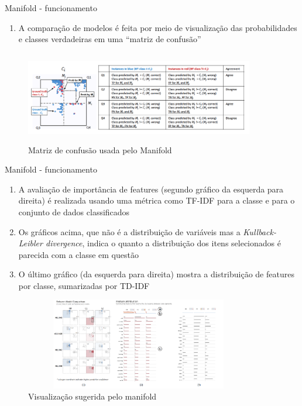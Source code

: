 \begin{frame}
	\begin{block}{Manifold - funcionamento}
		\begin{enumerate}
			\item A comparação de modelos é feita por meio de visualização das probabilidades e classes verdadeiras em uma ``matriz de confusão''
		\end{enumerate}
		\begin{figure}[!htb]
			\centering	  				
			\includegraphics[height=4cm, width = 10cm]{./pic/matrizManifold.png}
			\caption{Matriz de confusão usada pelo Manifold}
			\label{fig_ds_process}
		\end{figure}	
	\end{block}
\end{frame}


\begin{frame}
	\begin{block}{Manifold - funcionamento}
		\begin{enumerate}
			\item A avaliação de importância de features (segundo gráfico da esquerda para direita) é realizada usando uma métrica como TF-IDF para a classe e para o conjunto de dados classificados
			\item Os gráficos acima, que não é a distribuição de variáveis mas a \emph{Kullback-Leibler divergence}, indica o quanto a distribuição dos itens selecionados é parecida com a classe em questão
			\item O último gráfico (da esquerda para direita) mostra a distribuição de features por classe, sumarizadas por TD-IDF
		\end{enumerate}
		\begin{figure}[!htb]
			\centering	  				
			\includegraphics[height=4cm, width = 10cm]{./pic/manifold.png}
			\caption{Visualização sugerida pelo manifold}
			\label{fig_ds_process}
		\end{figure}	
	\end{block}
\end{frame}

